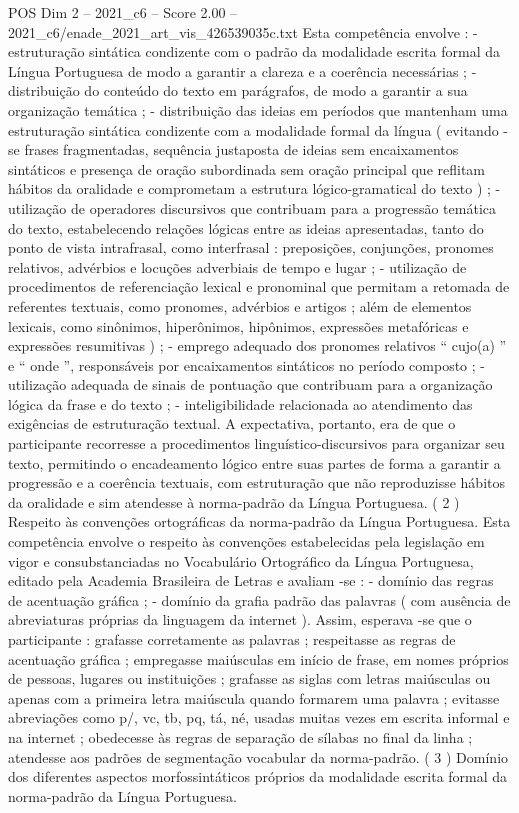 \begin{textsample}{POS Dim 2 – 2021\_c6 – Score 2.00 – 2021\_c6/enade\_2021\_art\_vis\_426539035c.txt}
Esta competência envolve : - estruturação sintática condizente com o padrão da modalidade escrita formal da Língua Portuguesa de modo a garantir a clareza e a coerência necessárias ; - distribuição do conteúdo do texto em parágrafos, de modo a garantir a sua organização temática ; - distribuição das ideias em períodos que mantenham uma estruturação sintática condizente com a modalidade formal da língua ( evitando -se frases fragmentadas, sequência justaposta de ideias sem encaixamentos sintáticos e presença de oração subordinada sem oração principal que reflitam hábitos da oralidade e comprometam a estrutura lógico-gramatical do texto ) ; - utilização de operadores discursivos que contribuam para a progressão temática do texto, estabelecendo relações lógicas entre as ideias apresentadas, tanto do ponto de vista intrafrasal, como interfrasal : preposições, conjunções, pronomes relativos, advérbios e locuções adverbiais de tempo e lugar ; - utilização de procedimentos de referenciação lexical e pronominal que permitam a retomada de referentes textuais, como pronomes, advérbios e artigos ; além de elementos lexicais, como sinônimos, hiperônimos, hipônimos, expressões metafóricas e expressões resumitivas ) ; - emprego adequado dos pronomes relativos “ cujo(a) ” e “ onde ”, responsáveis por encaixamentos sintáticos no período composto ; - utilização adequada de sinais de pontuação que contribuam para a organização lógica da frase e do texto ; - inteligibilidade relacionada ao atendimento das exigências de estruturação textual.
A expectativa, portanto, era de que o participante recorresse a procedimentos linguístico-discursivos para organizar seu texto, permitindo o encadeamento lógico entre suas partes de forma a garantir a progressão e a coerência textuais, com estruturação que não reproduzisse hábitos da oralidade e sim atendesse à norma-padrão da Língua Portuguesa. ( 2 ) Respeito às convenções ortográficas da norma-padrão da Língua Portuguesa.
Esta competência envolve o respeito às convenções estabelecidas pela legislação em vigor e consubstanciadas no Vocabulário Ortográfico da Língua Portuguesa, editado pela Academia Brasileira de Letras e avaliam -se : - domínio das regras de acentuação gráfica ; - domínio da grafia padrão das palavras ( com ausência de abreviaturas próprias da linguagem da internet ).
Assim, esperava -se que o participante : grafasse corretamente as palavras ; respeitasse as regras de acentuação gráfica ; empregasse maiúsculas em início de frase, em nomes próprios de pessoas, lugares ou instituições ; grafasse as siglas com letras maiúsculas ou apenas com a primeira letra maiúscula quando formarem uma palavra ; evitasse abreviações como p/, vc, tb, pq, tá, né, usadas muitas vezes em escrita informal e na internet ; obedecesse às regras de separação de sílabas no final da linha ; atendesse aos padrões de segmentação vocabular da norma-padrão. ( 3 ) Domínio dos diferentes aspectos morfossintáticos próprios da modalidade escrita formal da norma-padrão da Língua Portuguesa.

\end{textsample}
